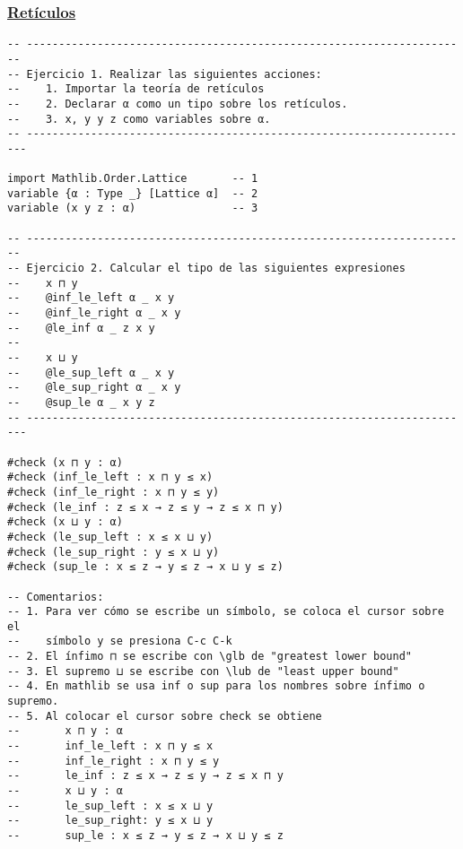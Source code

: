 \subsubsection{\href{./src/Basicos/Reticulos.lean}{Retículos}}
\label{sec:org8b49c33}
\begin{verbatim}
-- ---------------------------------------------------------------------
-- Ejercicio 1. Realizar las siguientes acciones:
--    1. Importar la teoría de retículos
--    2. Declarar α como un tipo sobre los retículos.
--    3. x, y y z como variables sobre α.
-- ----------------------------------------------------------------------

import Mathlib.Order.Lattice       -- 1
variable {α : Type _} [Lattice α]  -- 2
variable (x y z : α)               -- 3

-- ---------------------------------------------------------------------
-- Ejercicio 2. Calcular el tipo de las siguientes expresiones
--    x ⊓ y
--    @inf_le_left α _ x y
--    @inf_le_right α _ x y
--    @le_inf α _ z x y
--
--    x ⊔ y
--    @le_sup_left α _ x y
--    @le_sup_right α _ x y
--    @sup_le α _ x y z
-- ----------------------------------------------------------------------

#check (x ⊓ y : α)
#check (inf_le_left : x ⊓ y ≤ x)
#check (inf_le_right : x ⊓ y ≤ y)
#check (le_inf : z ≤ x → z ≤ y → z ≤ x ⊓ y)
#check (x ⊔ y : α)
#check (le_sup_left : x ≤ x ⊔ y)
#check (le_sup_right : y ≤ x ⊔ y)
#check (sup_le : x ≤ z → y ≤ z → x ⊔ y ≤ z)

-- Comentarios:
-- 1. Para ver cómo se escribe un símbolo, se coloca el cursor sobre el
--    símbolo y se presiona C-c C-k
-- 2. El ínfimo ⊓ se escribe con \glb de "greatest lower bound"
-- 3. El supremo ⊔ se escribe con \lub de "least upper bound"
-- 4. En mathlib se usa inf o sup para los nombres sobre ínfimo o supremo.
-- 5. Al colocar el cursor sobre check se obtiene
--       x ⊓ y : α
--       inf_le_left : x ⊓ y ≤ x
--       inf_le_right : x ⊓ y ≤ y
--       le_inf : z ≤ x → z ≤ y → z ≤ x ⊓ y
--       x ⊔ y : α
--       le_sup_left : x ≤ x ⊔ y
--       le_sup_right: y ≤ x ⊔ y
--       sup_le : x ≤ z → y ≤ z → x ⊔ y ≤ z
\end{verbatim}

